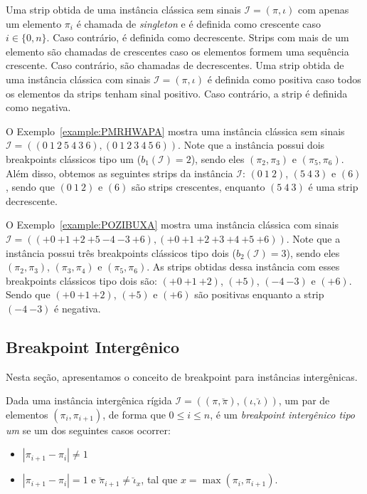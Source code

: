 Uma strip obtida de uma instância clássica sem sinais $\mathcal{I} = (\pi,\iota)$ com apenas um elemento $\pi_i$ é chamada de \emph{singleton} e é definida como crescente caso  $i \in \{0,n\}$. Caso contrário, é definida como decrescente. Strips com mais de um elemento são chamadas de crescentes caso os elementos formem uma sequência crescente. Caso contrário, são chamadas de decrescentes. Uma strip obtida de uma instância clássica com sinais $\mathcal{I} = (\pi,\iota)$ é definida como positiva caso todos os elementos da strips tenham sinal positivo. Caso contrário, a strip é definida como negativa.

O Exemplo~\ref{example:PMRHWAPA} mostra uma instância clássica sem sinais $\mathcal{I} = ((0~1~2~5~4~3~6),\allowbreak(0~1~2~3~4~5~6))$. Note que a instância possui dois breakpoints clássicos tipo um ($b_{1}(\mathcal{I}) = 2$), sendo eles $(\pi_2,\pi_3)$ e $(\pi_5,\pi_6)$. Além disso, obtemos as seguintes strips da instância $\mathcal{I}$: $(0~1~2)$, $(5~4~3)$ e $(6)$, sendo que $(0~1~2)$ e $(6)$ são strips crescentes, enquanto $(5~4~3)$ é uma strip decrescente.



O Exemplo~\ref{example:POZIBUXA} mostra uma instância clássica com sinais $\mathcal{I} = \allowbreak(({+0}~{+1}~{+2}~{+5}~{-4}~{-3}\allowbreak~{+6}),\allowbreak({+0}~{+1}~{+2}~{+3}~{+4}~{+5}~{+6}))$. Note que a instância possui três breakpoints clássicos tipo dois ($b_{2}(\mathcal{I}) = 3$), sendo eles $(\pi_2,\pi_3)$, $(\pi_3,\pi_4)$ e $(\pi_5,\pi_6)$. As strips obtidas dessa instância com esses breakpoints clássicos tipo dois são: $({+0}~{+1}~{+2})$, $({+5})$, $({-4}~{-3})$ e $({+6})$. Sendo que $({+0}~{+1}~{+2})$, $({+5})$ e $({+6})$ são positivas enquanto a strip $({-4}~{-3})$ é negativa.



\subsection{Breakpoint Intergênico}\label{subsection:JHXBSDPQ}

Nesta seção, apresentamos o conceito de breakpoint para instâncias intergênicas.

\begin{definition}
  Dada uma instância intergênica rígida $\mathcal{I} = ((\pi,\breve\pi),(\iota,\breve\iota))$, um par de elementos $(\pi_{i}, \pi_{i+1})$, de forma que $0 \le i \le n$, é um \emph{breakpoint intergênico tipo um} se um dos seguintes casos ocorrer:
  \begin{itemize}
    \item $|\pi_{i+1} - \pi_{i}| \ne 1$
    \item $|\pi_{i+1} - \pi_{i}| = 1$ e $\breve\pi_{i+1} \ne \breve\iota_{x}$, tal que $x = \max(\pi_{i}, \pi_{i+1})$.
  \end{itemize}
\end{definition}

